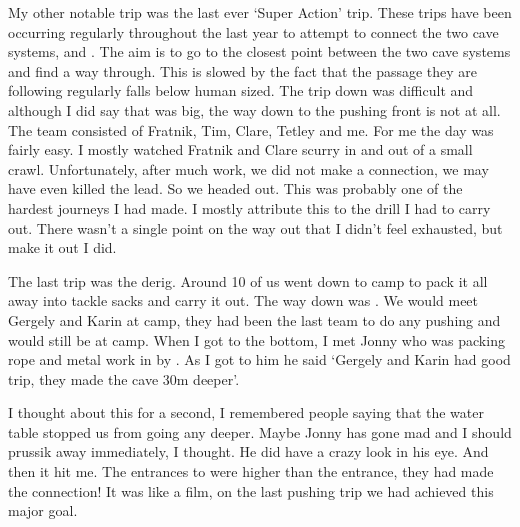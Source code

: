 My other notable trip was the last ever ‘Super Action’ trip. These trips have been occurring regularly throughout the last year to attempt to connect the two cave systems,  and . The aim is to go to the closest point between the two cave systems and find a way through. This is slowed by the fact that the passage they are following regularly falls below human sized. The trip down was difficult and although I did say that  was big, the way down to the pushing front is not at all. The team consisted of Fratnik, Tim, Clare, Tetley and me. For me the day was fairly easy. I mostly watched Fratnik and Clare scurry in and out of a small crawl. Unfortunately, after much work, we did not make a connection, we may have even killed the lead. So we headed out. This was probably one of the hardest journeys I had made. I mostly attribute this to the drill I had to carry out. There wasn’t a single point on the way out that I didn’t feel exhausted, but make it out I did.

The last trip was the derig. Around 10 of us went down to camp to pack it all away into tackle sacks and carry it out. The way down was . We would meet Gergely and Karin at camp, they had been the last team to do any pushing and would still be at camp. When I got to the bottom, I met Jonny who was packing rope and metal work in by . As I got to him he said ‘Gergely and Karin had good trip, they made the cave 30m deeper’.

I thought about this for a second, I remembered people saying that the water table stopped us from going any deeper. Maybe Jonny has gone mad and I should prussik away immediately, I thought. He did have a crazy look in his eye. And then it hit me. The entrances to  were higher than the  entrance, they had made the connection! It was like a film, on the last pushing trip we had achieved this major goal.

